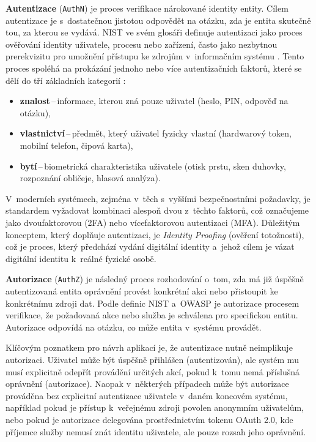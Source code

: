 \textbf{Autentizace} (\texttt{AuthN}) je proces verifikace nárokované identity entity.
Cílem autentizace je s~dostatečnou jistotou odpovědět na otázku, zda je entita skutečně tou, za kterou se vydává.
NIST ve svém glosáři definuje autentizaci jako proces ověřování identity uživatele, procesu nebo zařízení, často jako nezbytnou prerekvizitu pro umožnění přístupu ke zdrojům v~informačním systému \cite{NIST-800-63B-4}.
Tento proces spoléhá na prokázání jednoho nebo více autentizačních faktorů, které se dělí do tří základních kategorií \cite[2.3.1]{NIST-800-63-4}:
\begin{itemize}
    \item \textbf{znalost}\,--\,informace, kterou zná pouze uživatel (heslo, PIN, odpověď na otázku),
    \item \textbf{vlastnictví}\,--\,předmět, který uživatel fyzicky vlastní (hardwarový token, mobilní telefon, čipová karta),
    \item \textbf{bytí}\,--\,biometrická charakteristika uživatele (otisk prstu, sken duhovky, rozpoznání obličeje, hlasová analýza).
\end{itemize}

V~moderních systémech, zejména v~těch s~vyššími bezpečnostními požadavky, je standardem vyžadovat kombinaci alespoň dvou z~těchto faktorů, což označujeme jako dvoufaktorovou (2FA) nebo vícefaktorovou autentizaci (MFA).
Důležitým konceptem, který doplňuje autentizaci, je \emph{Identity Proofing} (ověření totožnosti), což je proces, který předchází vydání digitální identity a~jehož cílem je vázat digitální identitu k~reálné fyzické osobě.

\textbf{Autorizace} (\texttt{AuthZ}) je následný proces rozhodování o~tom, zda má již úspěšně autentizovaná entita oprávnění provést konkrétní akci nebo přistoupit ke konkrétnímu zdroji dat.
Podle definic NIST a~OWASP je autorizace procesem verifikace, že požadovaná akce nebo služba je schválena pro specifickou entitu.
Autorizace odpovídá na otázku, co může entita v~systému provádět.

Klíčovým poznatkem pro návrh aplikací je, že autentizace nutně neimplikuje autorizaci.
Uživatel může být úspěšně přihlášen (autentizován), ale systém mu musí explicitně odepřít provádění určitých akcí, pokud k~tomu nemá příslušná oprávnění (autorizace).
Naopak v~některých případech může být autorizace prováděna bez explicitní autentizace uživatele v~daném koncovém systému, například pokud je přístup k~veřejnému zdroji povolen anonymním uživatelům, nebo pokud je autorizace delegována prostřednictvím tokenu OAuth 2.0, kde příjemce služby nemusí znát identitu uživatele, ale pouze rozsah jeho oprávnění.


